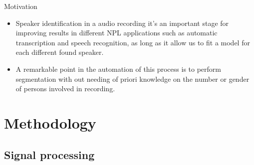 \documentclass[10pt]{beamer}
\begin{document}
\begin{frame}{Motivation}
  \begin{itemize}
    \itemsep 2.5em  
    \item Speaker identification in a audio recording it's an important stage 
    for improving results in different NPL applications such as automatic transcription
    and speech recognition, as long as it allow us to fit a model for each different found speaker.

    \item A remarkable point in the automation of this process is to perform segmentation with out needing 
    of priori knowledge on the number or gender of persons involved in recording.   
  \end{itemize}
\end{frame}

\section{Methodology}

\subsection{Signal processing}
\end{document}
